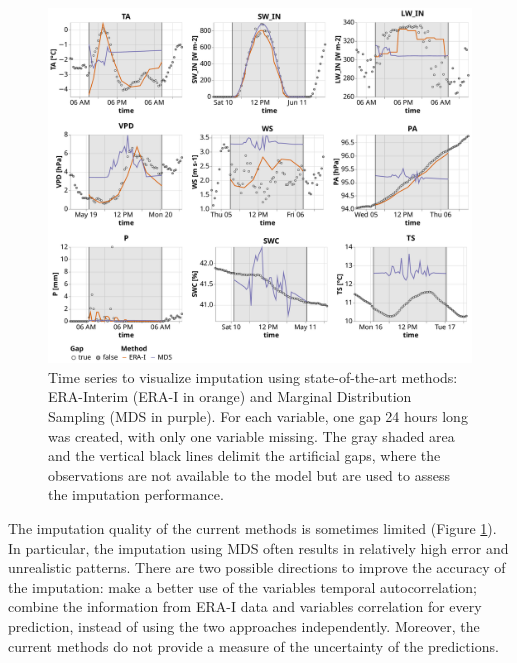 \documentclass{article}
\newcommand{\imgwidth}{6in}
\begin{document}
\begin{figure}
    \centerline{\includegraphics[width=\imgwidth]{timeseries_sota}}
\caption{Time series to visualize imputation using state-of-the-art methods: ERA-Interim (ERA-I in orange) and Marginal Distribution Sampling (MDS in purple). For each variable, one gap 24 hours long was created, with only one variable missing. The gray shaded area and the vertical black lines delimit the artificial gaps, where the observations are not available to the model but are used to assess the imputation performance.}
\label{fig:ts_sota}
\end{figure}

The imputation quality of the current methods is sometimes limited (Figure \ref{fig:ts_sota}). In particular, the imputation using MDS often results in relatively high error and unrealistic patterns. There are two possible directions to improve the accuracy of the imputation:  make a better use of the variables temporal autocorrelation; combine the information from ERA-I data and variables correlation for every prediction, instead of using the two approaches independently. Moreover, the current methods do not provide a measure of the uncertainty of the predictions.
\end{document}
